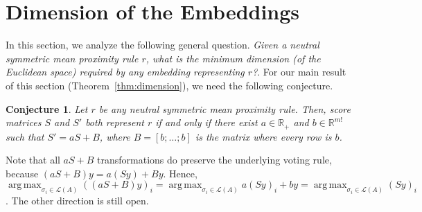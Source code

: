 \documentclass[10pt,letterpaper]{article}
\newcommand{\calL}{{\mathcal{L}}}
\newcommand{\rank}{{\calL(A)}}
\DeclareMathOperator*{\argmax}{arg\,max}
\newtheorem{conjecture}{Conjecture}
\begin{document}

\section{Dimension of the Embeddings}
\label{sec:min-dim}

In this section, we analyze the following general question. \emph{Given a neutral symmetric mean proximity rule $r$, what is the minimum dimension (of the Euclidean space) required by any embedding representing $r$?}. For our main result of this section (Theorem~\ref{thm:dimension}), we need the following conjecture.
\begin{conjecture}
Let $r$ be any neutral symmetric mean proximity rule. Then, score matrices $S$ and $S'$ both represent $r$ if and only if there exist $a \in \mathbb{R}_{+}$ and $b \in \mathbb{R}^{m!}$ such that $S' = aS+B$, where $B = [b;\ldots;b]$ is the matrix where every row is $b$. 
\label{conj:equivalent-score-matrix}
\end{conjecture}
Note that all $aS+B$ transformations do preserve the underlying voting rule, because $(aS+B)y = a(Sy)+By$. Hence, $\argmax_{\sigma_i \in \rank} ((aS+B)y)_i = \argmax_{\sigma_i \in \rank} a(Sy)_i + by = \argmax_{\sigma_i \in \rank} (Sy)_i$. The other direction is still open.
\end{document}
